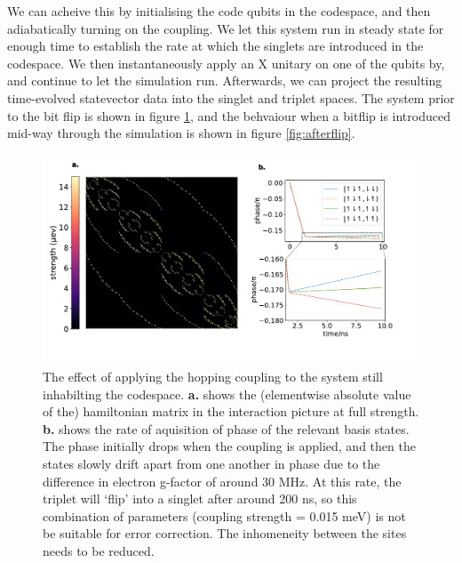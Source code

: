 \documentclass{report}
\begin{document}
We can acheive this by initialising the code qubits in the codespace, and then adiabatically turning on the coupling. We let this system run in steady state for enough time to establish the rate at which the singlets are introduced in the codespace. We then instantaneously apply an X unitary on one of the qubits by, and continue to let the simulation run. Afterwards, we can project the resulting time-evolved statevector data into the singlet and triplet spaces. The system prior to the bit flip is shown in figure \ref{fig:beforeflip}, and the behvaiour when a bitflip is introduced mid-way through the simulation is shown in figure \ref{fig:afterflip}.
\begin{figure}[h]
    \centering
    \includegraphics[scale = 1]{Figures/singlettriplet.pdf}
    \caption{The effect of applying the hopping coupling to the system still inhabilting the codespace. \textbf{a.} shows the (elementwise absolute value of the) hamiltonian matrix in the interaction picture at full strength. \textbf{b.} shows the rate of aquisition of phase of the relevant basis states. The phase initially drops when the coupling is applied, and then the states slowly drift apart from one another in phase due to the difference in electron g-factor of around 30 \unit{\mega\hertz}. At this rate, the triplet will `flip' into a singlet after around 200 \unit{\nano \second}, so this combination of parameters (coupling strength = 0.015 \unit{\milli\electronvolt}) is not be suitable for error correction. The inhomeneity between the sites needs to be reduced.
    }\label{fig:beforeflip}
\end{figure}
\end{document}
